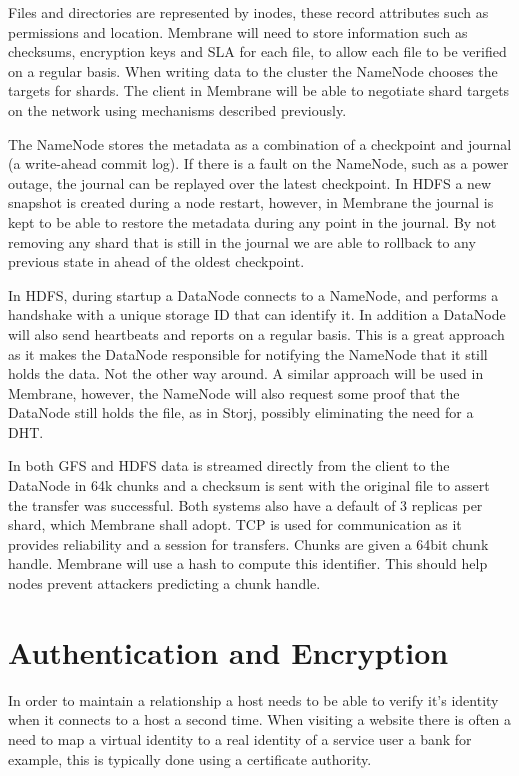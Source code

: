 \documentclass[11pt, a4paper, twoside]{report}
\begin{document}
Files and directories are represented by inodes, these record attributes such as permissions and location. Membrane will need to store information such as checksums, encryption keys and SLA for each file, to allow each file to be verified on a regular basis. When writing data to the cluster the NameNode chooses the targets for shards. The client in Membrane will be able to negotiate shard targets on the network using mechanisms described previously.

The NameNode stores the metadata as a combination of a checkpoint and journal (a write-ahead commit log). If there is a fault on the NameNode, such as a power outage, the journal can be replayed over the latest checkpoint. In HDFS a new snapshot is created during a node restart, however, in Membrane the journal is kept to be able to restore the metadata during any point in the journal. By not removing any shard that is still in the journal we are able to rollback to any previous state in ahead of the oldest checkpoint.

In HDFS, during startup a DataNode connects to a NameNode, and performs a handshake with a unique storage ID that can identify it. In addition a DataNode will also send heartbeats and reports on a regular basis. \cite{hdfsAnalysis} This is a great approach as it makes the DataNode responsible for notifying the NameNode that it still holds the data. Not the other way around. A similar approach will be used in Membrane, however, the NameNode will also request some proof that the DataNode still holds the file, as in Storj, possibly eliminating the need for a DHT.

In both GFS and HDFS data is streamed directly from the client to the DataNode in 64k chunks and a checksum is sent with the original file to assert the transfer was successful. Both systems also have a default of 3 replicas per shard, which Membrane shall adopt. TCP is used for communication as it provides reliability and a session for transfers. Chunks are given a 64bit chunk handle. Membrane will use a hash to compute this identifier. This should help nodes prevent attackers predicting a chunk handle.

\section{Authentication and Encryption} \label{sec:encryption}

In order to maintain a relationship a host needs to be able to verify it's identity when it connects to a host a second time. When visiting a website there is often a need to map a virtual identity to a real identity of a service user \citep{hericourt2001method} a bank for example, this is typically done using a certificate authority.
\end{document}
